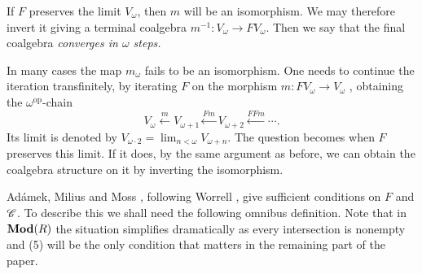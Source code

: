 \documentclass[runningheads]{llncs}
\begin{document}
If $F$ preserves the limit $V_\omega$, then $m$ will be an isomorphism. We may therefore invert it giving a terminal coalgebra $m^{-1} \colon V_\omega \to F V_\omega$. Then we say that the final coalgebra \emph{converges in $\omega$ steps.}

In many cases the map $m_{\omega}$ fails to be an isomorphism. One needs to continue the iteration transfinitely, by iterating $F$ on the morphism $m \colon F V_\omega \to V_\omega$ , obtaining the $\omega^{\mathrm{op}}$-chain
\begin{equation}
V_\omega \xleftarrow{m} V_{\omega+1} \xleftarrow{Fm} V_{\omega+2} \xleftarrow{F F m} \cdots .
\end{equation}
Its limit is denoted by $V_{\omega \cdot 2} = \lim_{n<\omega} V_{\omega+n}.$
The question becomes when $F$ preserves this limit. If it does, by the same argument as before, we can obtain the coalgebra structure on it by inverting the isomorphism. 

Ad\'amek, Milius and Moss \cite{AdamekEA25}, following Worrell \cite{Worrell99,Worrell05},  give sufficient conditions on $F$ and $\mathscr{C}$. To describe this we shall need the following omnibus definition. Note that in $\operatorname{\mathbf{Mod}}(R)$ the situation simplifies dramatically as every intersection is nonempty and (5) will be the only condition that matters in the remaining part of the paper.
\end{document}
